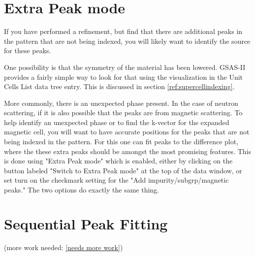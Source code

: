 \section{Extra Peak mode}\label{ref:extrapeak}
If you have performed a refinement, but find that there are additional peaks in the pattern that are not being indexed, you will likely want to identify the source for these peaks. 

One possibility is that the symmetry of the material has been lowered. GSAS-II provides a fairly simple way to look for that using the visualization in the Unit Cells List data tree entry. This is discussed in section \ref{ref:supercellindexing}.

More commonly, there is an unexpected phase present. In the case of neutron scattering, if it is also possible that the peaks are from magnetic scattering. To help identify an unexpected phase or to find the k-vector for the expanded magnetic cell, you will want to have accurate positions for the peaks that are not being indexed in the pattern. For this one can fit peaks to the difference plot, where the these extra peaks should be amongst the most promising features. This is done using "Extra Peak mode" which is enabled, either by clicking on the button labeled "Switch to Extra Peak mode" at the top of the data window, or set turn on the checkmark  setting for the "Add impurity/subgrp/magnetic peaks." The two options do exactly the same thing. 


\section{Sequential Peak Fitting}\label{ref:seqpeak}

(more work needed: \ref{needs more work})